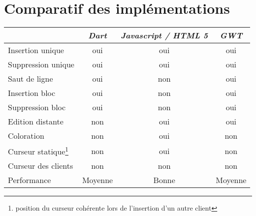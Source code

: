 \section{Comparatif des implémentations}
\begin{table}[h!]
	\center
	\begin{tabular}{|l|c|c|c|} 
	\hline
	 ~ & \emph{Dart} & \emph{Javascript / HTML 5} & \emph{GWT}\\
	\hline
	Insertion unique & oui & oui &oui\\
	\hline
	Suppression unique & oui & oui & oui\\
	\hline
	Saut de ligne & oui & non & oui\\
	\hline
	Insertion bloc & oui & non & oui\\
	\hline
	Suppression bloc & oui & non & oui\\
	\hline
	Edition distante & non & oui & oui \\
	\hline
	Coloration & non & oui & non \\
	\hline
	Curseur statique\footnote{position du curseur cohérente lors de l'insertion d'un autre client} & non & oui & non \\ 
	\hline
	Curseur des clients & non & non & non \\
	\hline
	Performance & Moyenne & Bonne & Moyenne \\ 
	\hline
	\end{tabular}
\end{table}
